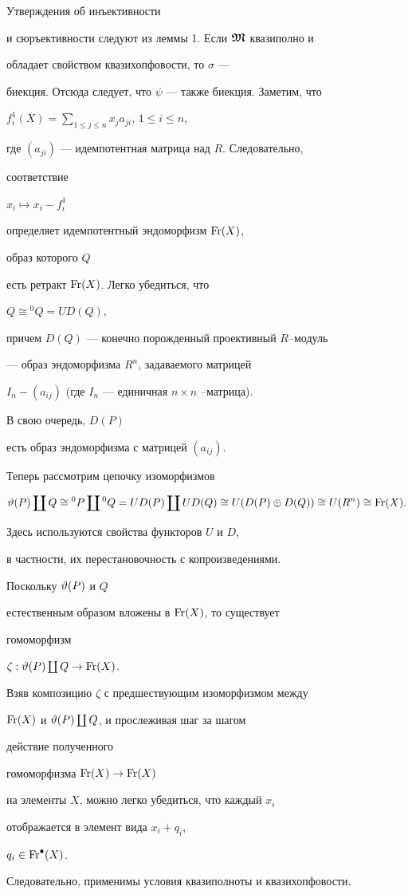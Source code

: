 \begin{pf} Утверждения об инъективности


и сюръективности следуют из леммы 1. Если $\boldsymbol{\frak M}$ квазиполно и


обладает свойством квазихопфовости, то $ \sigma $ ---


биекция. Отсюда следует, что $\psi$ --- также биекция. Заметим, что


$f^1_i(X)=\sum\limits_{1\le j \le n}x_j a_{ji}$, $1\le i \le n$,


где $(a_{ji})$ --- идемпотентная матрица над $R$. Следовательно,


соответствие


$x_i \longmapsto x_i -f^1_i$


определяет идемпотентный эндоморфизм $\operatorname{Fr}(X)$,


образ которого $Q$


есть ретракт $\operatorname{Fr}(X) $. Легко убедиться, что


$Q \cong {}^0 Q= UD(Q)$,


причем $D(Q)$ --- конечно порожденный проективный $R$--модуль


--- образ эндоморфизма $R^n$, задаваемого матрицей


$I_n -(a_{ij})$ (где $I_n$ --- единичная $n\times n$ --матрица).


В свою очередь, $D(P)$


есть образ эндоморфизма с матрицей $(a_{ij}) $.


Теперь рассмотрим цепочку изоморфизмов


$$


\te(P)\coprod Q \cong {}^0 P \coprod {}^0 Q =


UD(P)\coprod UD(Q)


\cong U(D(P)\oplus D(Q)) \cong U(R^n) \cong \Fr(X).


$$


Здесь используются свойства функторов $U$ и $D$,


в частности, их перестановочность с копроизведениями.


Поскольку $\vartheta(P)$ и $Q$


естественным образом вложены в $\operatorname{Fr}(X)$, то существует


гомоморфизм


$\zeta: \vartheta(P) \coprod Q \to \operatorname{Fr}(X)$.


Взяв композицию $\zeta$ с предшествующим изоморфизмом между


$\operatorname{Fr}(X)$ и $\vartheta(P) \coprod Q$, и прослеживая шаг за шагом


действие полученного


гомоморфизма $\operatorname{Fr}(X)\to \operatorname{Fr}(X)$


на элементы $X$, можно легко убедиться, что каждый $x_i$


отображается в элемент вида $x_i+q_i$,


$q_i\in \operatorname{Fr}^{\bullet}(X)$.


Следовательно, применимы условия квазиполноты и квазихопфовости.


\end{pf}





